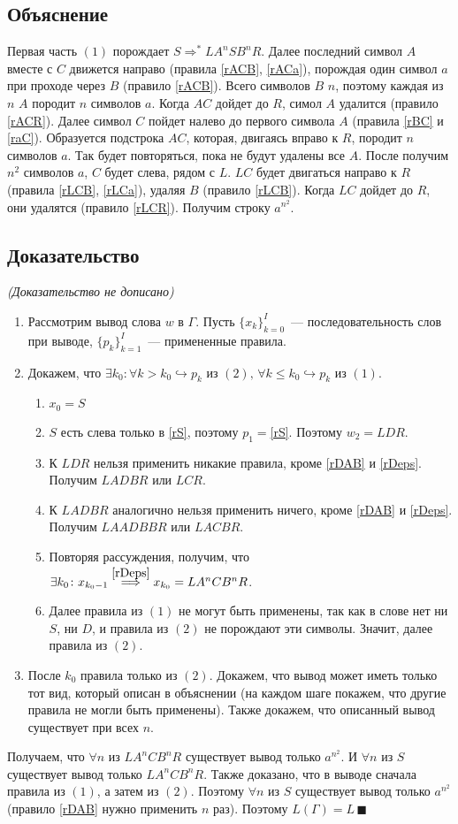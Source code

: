 \documentclass[a4paper]{article}
\begin{document}
\subsection*{Объяснение}
Первая часть $(1)$ порождает $S\Longrightarrow^* LA^nSB^nR$. Далее последний символ $A$ вместе с $C$ движется направо (правила \ref{rACB}, \ref{rACa}), порождая один символ $a$ при проходе через $B$ (правило \ref{rACB}). Всего символов $B$ $n$, поэтому каждая из $n$ $A$ породит $n$ символов $a$. Когда $AC$ дойдет до $R$, симол $A$ удалится (правило \ref{rACR}). Далее символ $C$ пойдет налево до первого символа $A$ (правила \ref{rBC} и \ref{raC}). Образуется подстрока $AC$, которая, двигаясь вправо к $R$, породит $n$ символов $a$. Так будет повторяться, пока не будут удалены все $A$. После получим $n^2$ символов $a$, $C$ будет слева, рядом с $L$. $LC$ будет двигаться направо к $R$ (правила \ref{rLCB}, \ref{rLCa}), удаляя $B$ (правило \ref{rLCB}). Когда $LC$ дойдет до $R$, они удалятся (правило \ref{rLCR}). Получим строку $a^{n^2}$.
\subsection*{Доказательство}
{\em{(Доказательство не дописано)}}
\begin{enumerate}
\item Рассмотрим вывод слова $w$ в $\Gamma$. Пусть $\{x_k\}_{k=0}^I$~--- последовательность слов при выводе, $\{p_k\}_{k=1}^I$~--- примененные правила.
\item Докажем, что $\exists k_0\colon \forall k> k_0\hookrightarrow p_k\mbox{ из } (2),\,\forall k\leqslant k_0\hookrightarrow p_k\mbox{ из } (1)$. \begin{enumerate}
\item $x_0=S$
\item $S$ есть слева только в \ref{rS}, поэтому $p_1=$\ref{rS}. Поэтому $w_2=LDR$.
\item К $LDR$ нельзя применить никакие правила, кроме \ref{rDAB} и \ref{rDeps}. Получим $LADBR$ или $LCR$.
\item К $LADBR$ аналогично нельзя применить ничего, кроме \ref{rDAB} и \ref{rDeps}. Получим $LAADBBR$ или $LACBR$.
\item Повторяя рассуждения, получим, что $\exists k_0\colon x_{k_0-1}\overset{\ref{rDeps}}{\Longrightarrow} x_{k_0}=LA^nCB^nR$.
\item Далее правила из $(1)$ не могут быть применены, так как в слове нет ни $S$, ни $D$, и правила из $(2)$ не порождают эти символы. Значит, далее правила из $(2)$.
\end{enumerate}
\item После $k_0$ правила только из $(2)$. Докажем, что вывод может иметь только тот вид, который описан в объяснении (на каждом шаге покажем, что другие правила не могли быть применены). Также докажем, что описанный вывод существует при всех $n$.
\end{enumerate}
Получаем, что $\forall n$ из $LA^nCB^nR$ существует вывод только $a^{n^2}$. И $\forall n$ из $S$ существует вывод только $LA^nCB^nR$. Также доказано, что в выводе сначала правила из $(1)$, а затем из $(2)$. Поэтому $\forall n$ из $S$ существует вывод только $a^{n^2}$ (правило \ref{rDAB} нужно применить $n$ раз). Поэтому $L(\Gamma)=L\,\blacksquare$
\end{document}
